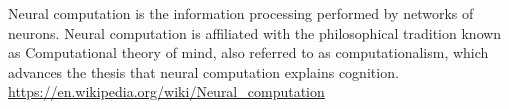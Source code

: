 \documentclass[a4paper]{article}
\title{}
\date{}
\begin{document}
\maketitle
    Neural computation is the information processing performed by networks of neurons. Neural computation is affiliated with the philosophical tradition known as Computational theory of mind, also referred to as computationalism, which advances the thesis that neural computation explains cognition.
    \url{https://en.wikipedia.org/wiki/Neural_computation}

    
    
\end{document}
